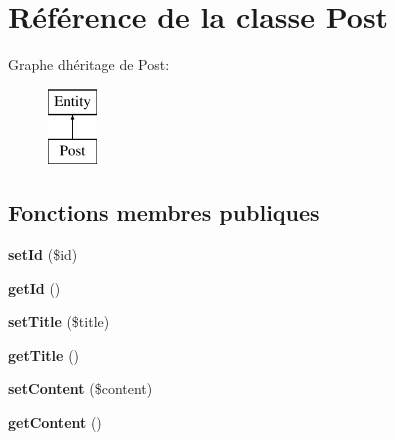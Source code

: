 \hypertarget{class_entity_1_1_post}{}\section{Référence de la classe Post}
\label{class_entity_1_1_post}
Graphe d\textquotesingle{}héritage de Post\+:\begin{figure}[H]
\begin{center}
\leavevmode
\includegraphics[height=2.000000cm]{class_entity_1_1_post}
\end{center}
\end{figure}
\subsection*{Fonctions membres publiques}
\begin{DoxyCompactItemize}
\item 
{\bfseries set\+Id} (\$id)\hypertarget{class_entity_1_1_post_a87313ad678fb2a2a8efb435cf0bdb9a0}{}\label{class_entity_1_1_post_a87313ad678fb2a2a8efb435cf0bdb9a0}

\item 
{\bfseries get\+Id} ()\hypertarget{class_entity_1_1_post_a12251d0c022e9e21c137a105ff683f13}{}\label{class_entity_1_1_post_a12251d0c022e9e21c137a105ff683f13}

\item 
{\bfseries set\+Title} (\$title)\hypertarget{class_entity_1_1_post_a884ba9bb0d54bde7839e798db7964476}{}\label{class_entity_1_1_post_a884ba9bb0d54bde7839e798db7964476}

\item 
{\bfseries get\+Title} ()\hypertarget{class_entity_1_1_post_a95e859a4588a39a1824b717378a84c29}{}\label{class_entity_1_1_post_a95e859a4588a39a1824b717378a84c29}

\item 
{\bfseries set\+Content} (\$content)\hypertarget{class_entity_1_1_post_a04a5eddb7c3abc7bf31fa25b58f046bf}{}\label{class_entity_1_1_post_a04a5eddb7c3abc7bf31fa25b58f046bf}

\item 
{\bfseries get\+Content} ()\hypertarget{class_entity_1_1_post_a58e43f09a06ce4e29b192c4e17ce7915}{}\label{class_entity_1_1_post_a58e43f09a06ce4e29b192c4e17ce7915}

\end{DoxyCompactItemize}
